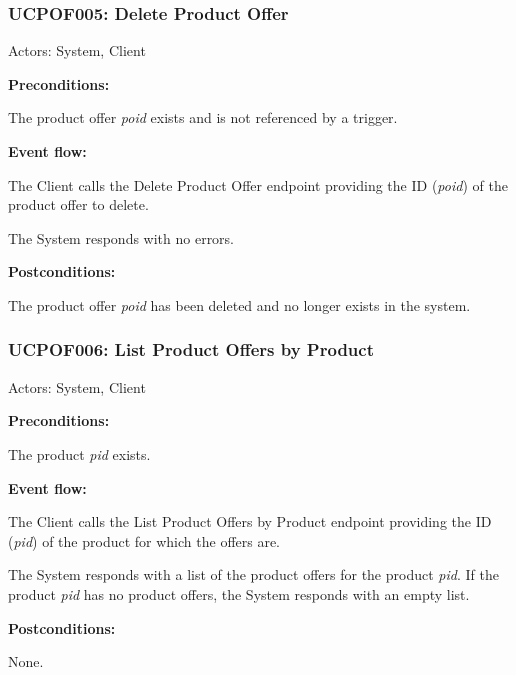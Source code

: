 \begin{ucbox}{\subsubsection{UCPOF005: Delete Product Offer}}
\label{UCPOF005}

Actors: System, Client

\textbf{Preconditions:}

\ucitem The product offer \textit{poid} exists and is not referenced by a trigger.

\textbf{Event flow:}

\ucitem The Client calls the Delete Product Offer endpoint providing the ID (\textit{poid}) of the product offer to delete.

\ucitem The System responds with no errors.

\textbf{Postconditions:}

\ucitem The product offer \textit{poid} has been deleted and no longer exists in the system.

\end{ucbox}

\begin{ucbox}{\subsubsection{UCPOF006: List Product Offers by Product}}
\label{UCPOF006}

Actors: System, Client

\textbf{Preconditions:}

\ucitem The product \textit{pid} exists.

\textbf{Event flow:}

\ucitem The Client calls the List Product Offers by Product endpoint providing the ID (\textit{pid}) of the product for which the offers are.

\ucitem The System responds with a list of the product offers for the product \textit{pid}. If the product \textit{pid} has no product offers, the System responds with an empty list.

\textbf{Postconditions:}

\ucitem None.

\end{ucbox}

